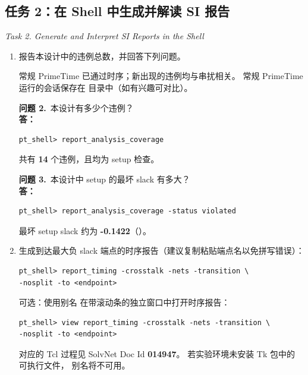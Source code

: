 \subsection{任务 2：在 Shell 中生成并解读 SI 报告}
\label{lab8:task2}

\noindent\textit{Task 2. Generate and Interpret SI Reports in the Shell}

\begin{enumerate}
  \item 报告本设计中的违例总数，并回答下列问题。

\begin{noteBox}
常规 PrimeTime 已通过时序；新出现的违例均与串扰相关。
常规 PrimeTime 运行的会话保存在  目录中（如有兴趣可对比）。
\end{noteBox}

\begin{questionBox}
\textbf{问题 2.}\ 本设计有多少个违例？\\[0.35em]
\textbf{答：} \
\begin{lstlisting}
pt_shell> report_analysis_coverage
\end{lstlisting}
共有 \textbf{14} 个违例，且均为 setup 检查。

\textbf{问题 3.}\ 本设计中 setup 的最坏 slack 有多大？\\[0.35em]
\textbf{答：} \
\begin{lstlisting}
pt_shell> report_analysis_coverage -status violated
\end{lstlisting}
最坏 setup slack 约为 \textbf{-0.1422}（）。
\end{questionBox}

  \item 生成到达最大负 slack 端点的时序报告（建议复制粘贴端点名以免拼写错误）：
\begin{lstlisting}
pt_shell> report_timing -crosstalk -nets -transition \
-nosplit -to <endpoint>
\end{lstlisting}

\begin{noteBox}
可选：使用别名  在带滚动条的独立窗口中打开时序报告：
\begin{lstlisting}
pt_shell> view report_timing -crosstalk -nets -transition \
-nosplit -to <endpoint>
\end{lstlisting}
\cmd{view} 对应的 Tcl 过程见 SolvNet Doc Id \textbf{014947}。
若实验环境未安装 Tk 包中的 \cmd{wish} 可执行文件，\cmd{view} 别名将不可用。
\end{noteBox}


\end{enumerate}
